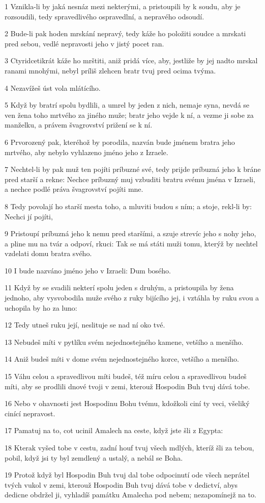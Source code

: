 \par 1 Vznikla-li by jaká nesnáz mezi nekterými, a pristoupili by k soudu, aby je rozsoudili, tedy spravedlivého ospravedlní, a nepravého odsoudí.
\par 2 Bude-li pak hoden mrskání nepravý, tedy káže ho položiti soudce a mrskati pred sebou, vedlé nepravosti jeho v jistý pocet ran.
\par 3 Ctyridcetikrát káže ho mrštiti, aniž pridá více, aby, jestliže by jej nadto mrskal ranami mnohými, nebyl príliš zlehcen bratr tvuj pred ocima tvýma.
\par 4 Nezavížeš úst vola mlátícího.
\par 5 Když by bratrí spolu bydlili, a umrel by jeden z nich, nemaje syna, nevdá se ven žena toho mrtvého za jiného muže; bratr jeho vejde k ní, a vezme ji sobe za manželku, a právem švagrovství prižení se k ní.
\par 6 Prvorozený pak, kteréhož by porodila, nazván bude jménem bratra jeho mrtvého, aby nebylo vyhlazeno jméno jeho z Izraele.
\par 7 Nechtel-li by pak muž ten pojíti príbuzné své, tedy prijde príbuzná jeho k bráne pred starší a rekne: Nechce príbuzný muj vzbuditi bratru svému jména v Izraeli, a nechce podlé práva švagrovství pojíti mne.
\par 8 Tedy povolají ho starší mesta toho, a mluviti budou s ním; a stoje, rekl-li by: Nechci jí pojíti,
\par 9 Pristoupí príbuzná jeho k nemu pred staršími, a szuje strevíc jeho s nohy jeho, a pline mu na tvár a odpoví, rkuci: Tak se má státi muži tomu, kterýž by nechtel vzdelati domu bratra svého.
\par 10 I bude nazváno jméno jeho v Izraeli: Dum bosého.
\par 11 Když by se svadili nekterí spolu jeden s druhým, a pristoupila by žena jednoho, aby vysvobodila muže svého z ruky bijícího jej, i vztáhla by ruku svou a uchopila by ho za luno:
\par 12 Tedy utneš ruku její, neslituje se nad ní oko tvé.
\par 13 Nebudeš míti v pytlíku svém nejednostejného kamene, vetšího a menšího.
\par 14 Aniž budeš míti v dome svém nejednostejného korce, vetšího a menšího.
\par 15 Váhu celou a spravedlivou míti budeš, též míru celou a spravedlivou budeš míti, aby se prodlili dnové tvoji v zemi, kterouž Hospodin Buh tvuj dává tobe.
\par 16 Nebo v ohavnosti jest Hospodinu Bohu tvému, kdožkoli ciní ty veci, všeliký cinící nepravost.
\par 17 Pamatuj na to, cot ucinil Amalech na ceste, když jste šli z Egypta:
\par 18 Kterak vyšed tobe v cestu, zadní houf tvuj všech mdlých, kteríž šli za tebou, pobil, když jsi ty byl zemdlený a ustalý, a nebál se Boha.
\par 19 Protož když byl Hospodin Buh tvuj dal tobe odpocinutí ode všech neprátel tvých vukol v zemi, kterouž Hospodin Buh tvuj dává tobe v dedictví, abys dedicne obdržel ji, vyhladíš památku Amalecha pod nebem; nezapomínejž na to.

